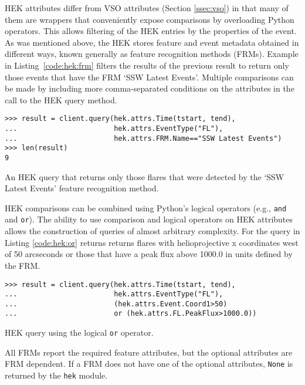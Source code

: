 HEK attributes differ from VSO attributes (Section \ref{ssec:vso}) in that many 
of them are wrappers that conveniently expose comparisons by overloading Python 
operators. This allows filtering of the HEK entries by the properties of the 
event. As was mentioned above, the HEK stores feature and event metadata obtained 
in different ways, known generally as feature recognition methods (FRMs). 
Example in Listing~\ref{code:hek:frm} filters the results of the previous 
result to return only those events that have the FRM `SSW Latest Events'.  
Multiple comparisons can be made by including more comma-separated
conditions on the attributes in the call to the HEK query method.

\begin{listing}[H]
\begin{verbatim}
>>> result = client.query(hek.attrs.Time(tstart, tend), 
...                       hek.attrs.EventType("FL"),
...                       hek.attrs.FRM.Name=="SSW Latest Events")
>>> len(result)
9
\end{verbatim}
\caption{An HEK query that returns only those flares that were
  detected by the `SSW Latest Events' feature recognition method.}
\label{code:hek:frm}
\end{listing}

HEK comparisons can be combined using Python's logical operators (e.g., \texttt{and}
and \texttt{or}). The ability to use comparison and logical operators on HEK attributes allows 
the construction of queries of almost arbitrary complexity.
For the query in Listing \ref{code:hek:or} returns
returns flares with helioprojective x coordinates west of 50 arcseconds or 
those that have a peak flux above 1000.0 in units defined by the FRM.

\begin{listing}[H]
\begin{verbatim}
>>> result = client.query(hek.attrs.Time(tstart, tend), 
...                       hek.attrs.EventType("FL"),
...                       (hek.attrs.Event.Coord1>50) 
...                       or (hek.attrs.FL.PeakFlux>1000.0))
\end{verbatim}
\caption{HEK query using the logical \texttt{or} operator.}
\label{code:hek:or}
\end{listing}
All FRMs report the required feature attributes, but the optional attributes 
are FRM dependent.  If a FRM does not have one of the optional attributes, 
\texttt{None} is returned by the \texttt{hek} module. 
 
